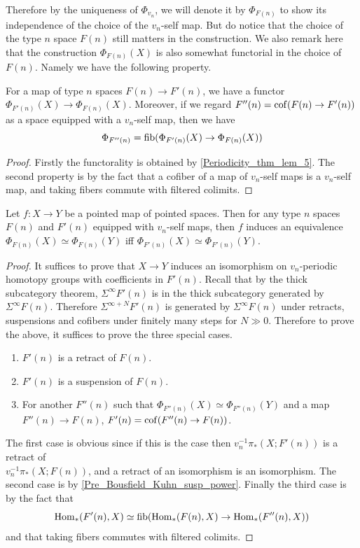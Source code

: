 	Therefore by the uniqueness of $\Phi_{v_n}$, we will denote it by $\Phi_{F(n)}$ to show its independence of the choice of the $v_n$-self map. But do notice that the choice of the type $n$ space $F(n)$ still matters in the construction. 
	We also remark here that the construction $\Phi_{F(n)}(X)$ is also somewhat functorial in the choice of $F(n)$. Namely we have the following property. 
	
	\begin{lemma}\label{Pre_Bousfield_Kuhn_cofib}
		For a map of type $n$ spaces $F(n)\to F'(n)$, we have a functor $\Phi_{F'(n)}(X)\to\Phi_{F(n)}(X)$. Moreover, if we regard $F''(n)=\operatorname{\mathrm{cof}}(F(n)\to F'(n))$ as a space equipped with a $v_n$-self map, then we have 
		\[ \Phi_{F''(n)}=\operatorname{\mathrm{fib}}(\Phi_{F'(n)}(X)\to\Phi_{F(n)}(X)) \]
	\end{lemma}
	\begin{proof}
		Firstly the functorality is obtained by \cref{Periodicity_thm_lem_5}. The second property is by the fact that a cofiber of a map of $v_n$-self maps is a $v_n$-self map, and taking fibers commute with filtered colimits. 
	\end{proof}

	\begin{thm}\label{Periodic_equiv_indep_type_n}
		Let $f:X\to Y$ be a pointed map of pointed spaces. Then for any type $n$ spaces $F(n)$ and $F'(n)$ equipped with $v_n$-self maps, then $f$ induces an equivalence $\Phi_{F(n)}(X)\simeq\Phi_{F(n)}(Y)$ iff $\Phi_{F'(n)}(X)\simeq\Phi_{F'(n)}(Y)$. 
	\end{thm}
	\begin{proof}
		It suffices to prove that $X\to Y$ induces an isomorphism on $v_n$-periodic homotopy groups with coefficients in $F'(n)$. Recall that by the thick subcategory theorem, $\Sigma^\infty F'(n)$ is in the thick subcategory generated by $\Sigma^\infty F(n)$. Therefore $\Sigma^{\infty+N}F'(n)$ is generated by $\Sigma^\infty F(n)$ under retracts, suspensions and cofibers under finitely many steps for $N\gg0$. Therefore to prove the above, it suffices to prove the three special cases. 
		\begin{enumerate}
			\item $F'(n)$ is a retract of $F(n)$. 
			\item $F'(n)$ is a suspension of $F(n)$. 
			\item For another $F''(n)$ such that $\Phi_{F''(n)}(X)\simeq\Phi_{F''(n)}(Y)$ and a map $F''(n)\to F(n)$, $F'(n)=\operatorname{\mathrm{cof}}(F''(n)\to F(n))$. 
		\end{enumerate}
		The first case is obvious since if this is the case then $v_n^{-1}\pi_*(X;F'(n))$ is a retract of \\
		$v_n^{-1}\pi_*(X;F(n))$, and a retract of an isomorphism is an isomorphism. The second case is by \cref{Pre_Bousfield_Kuhn_susp_power}. Finally the third case is by the fact that 
		\[ \operatorname{\mathrm{Hom}}_*(F'(n),X)\simeq\operatorname{\mathrm{fib}}(\operatorname{\mathrm{Hom}}_*(F(n),X)\to\operatorname{\mathrm{Hom}}_*(F''(n),X)) \]
		and that taking fibers commutes with filtered colimits. 
	\end{proof}

